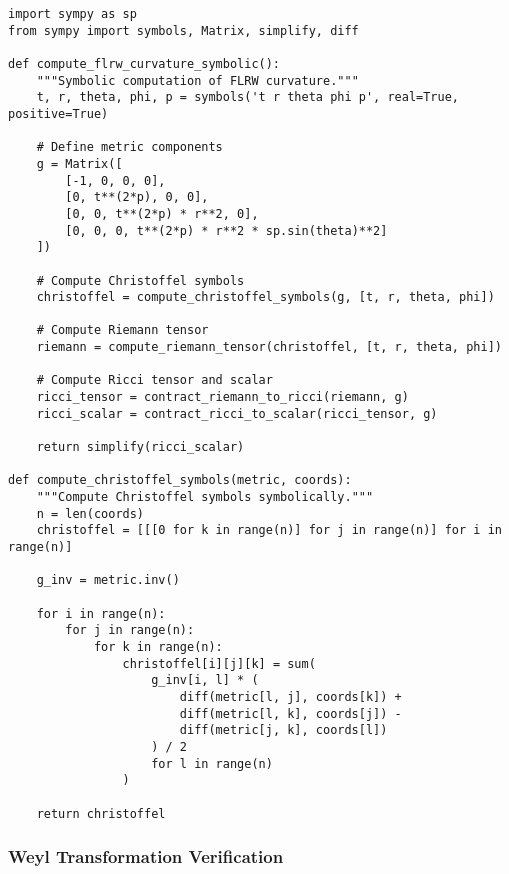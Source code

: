 \begin{verbatim}
import sympy as sp
from sympy import symbols, Matrix, simplify, diff

def compute_flrw_curvature_symbolic():
    """Symbolic computation of FLRW curvature."""
    t, r, theta, phi, p = symbols('t r theta phi p', real=True, positive=True)
    
    # Define metric components
    g = Matrix([
        [-1, 0, 0, 0],
        [0, t**(2*p), 0, 0],
        [0, 0, t**(2*p) * r**2, 0],
        [0, 0, 0, t**(2*p) * r**2 * sp.sin(theta)**2]
    ])
    
    # Compute Christoffel symbols
    christoffel = compute_christoffel_symbols(g, [t, r, theta, phi])
    
    # Compute Riemann tensor
    riemann = compute_riemann_tensor(christoffel, [t, r, theta, phi])
    
    # Compute Ricci tensor and scalar
    ricci_tensor = contract_riemann_to_ricci(riemann, g)
    ricci_scalar = contract_ricci_to_scalar(ricci_tensor, g)
    
    return simplify(ricci_scalar)

def compute_christoffel_symbols(metric, coords):
    """Compute Christoffel symbols symbolically."""
    n = len(coords)
    christoffel = [[[0 for k in range(n)] for j in range(n)] for i in range(n)]
    
    g_inv = metric.inv()
    
    for i in range(n):
        for j in range(n):
            for k in range(n):
                christoffel[i][j][k] = sum(
                    g_inv[i, l] * (
                        diff(metric[l, j], coords[k]) +
                        diff(metric[l, k], coords[j]) -
                        diff(metric[j, k], coords[l])
                    ) / 2
                    for l in range(n)
                )
    
    return christoffel
\end{verbatim}

\subsubsection{Weyl Transformation Verification}


